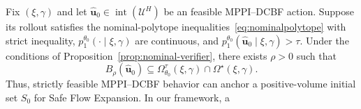 \begin{itemize}[leftmargin=0pt, itemindent=0pt, label={}]
Fix $(\xi,\gamma)$ and let $\hat{\mathbf u}_0\in
\operatorname{int}(\mathcal U^H)$ be an feasible MPPI--DCBF action. Suppose its rollout satisfies the nominal-polytope inequalities~\ref{eq:nominalpolytope} with strict inequality, $p_1^{\theta_0}(\cdot\mid\xi,\gamma)$ are continuous, and $p_1^{\theta_0}(\hat{\mathbf u}_0\mid\xi,\gamma)>\tau$. Under the conditions of Proposition~\ref{prop:nominal-verifier}, there exists $\rho>0$ such that
\begin{equation}
B_\rho(\hat{\mathbf u}_0)
\subseteq
\Omega_{\theta_0}^\tau(\xi,\gamma)
\cap
\Omega^\star(\xi,\gamma).
\end{equation}
Thus, strictly feasible MPPI--DCBF behavior can anchor a
positive-volume initial set $S_0$ for Safe Flow Expansion.
In our framework, a






\end{itemize}
